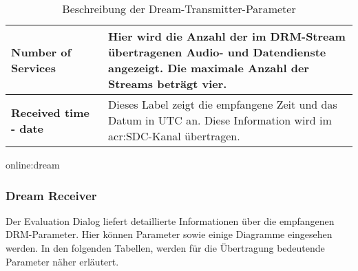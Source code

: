\begin{table}[h]
\begin{center}
\begin{tabular}{|p{0.28\linewidth} | p{0.72\linewidth}|}
			\midrule
			\textbf{Number of Services} & Hier wird die Anzahl der im DRM-Stream übertragenen Audio- und Datendienste angezeigt. Die maximale Anzahl der Streams beträgt vier.\\
			\midrule
			\textbf{Received time - date} & Dieses Label zeigt die empfangene Zeit und das Datum in UTC an. Diese Information wird im \gls{acr:SDC}-Kanal übertragen.\\
			\bottomrule
		\end{tabular}
		\caption{Beschreibung der Dream-Transmitter-Parameter}\gls{online:dream}
		\label{tab:dreamparam}
	\end{center}
\end{table}

\subsubsection{Dream Receiver}
\label{subsec:Unterabschnitt12}

Der Evaluation Dialog liefert detaillierte Informationen über die empfangenen DRM-Parameter. Hier können Parameter sowie einige Diagramme eingesehen werden. In den folgenden Tabellen, werden für die Übertragung bedeutende Parameter näher erläutert.

